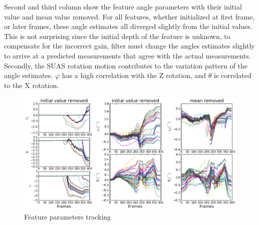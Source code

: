 Second and third column show the feature angle parameters with their
initial value and mean value removed. For all features, whether
initialized at first frame, or later frames, these angle estimates all
diverged slightly from the initial values. This is not surprising
since the initial depth of the feature is unknown, to compensate for
the incorrect gain, filter must change the angles estimates slightly
to arrive at a predicted measurements that agree with the actual
measurements. Secondly, the SUAS rotation motion contributes to the
variation pattern of the angle estimates. $\varphi$ has a high
correlation with the Z rotation, and $\theta$ is correlated to the X
rotation. 

\begin{figure}[h]
\centering
\includegraphics[width=14cm, keepaspectratio=true]
{./Figures/fltfig/cut1/Figure20.png}
\caption{Feature parameters tracking}
\label{fltfig:2}
\end{figure}


\FloatBarrier

